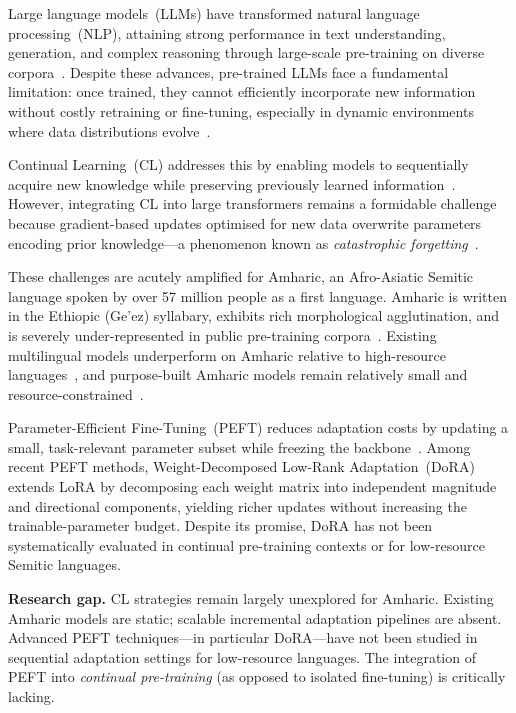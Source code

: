 \documentclass[11pt,a4paper]{article}
\begin{document}
Large language models~(LLMs) have transformed natural language
processing~(NLP), attaining strong performance in text understanding,
generation, and complex reasoning through large-scale pre-training on
diverse corpora~\cite{Vaswani2017,Brown2020,Devlin2019}.  Despite
these advances, pre-trained LLMs face a fundamental limitation: once
trained, they cannot efficiently incorporate new information without
costly retraining or fine-tuning, especially in dynamic environments
where data distributions evolve~\cite{Wang2023survey}.

Continual Learning~(CL) addresses this by enabling models to
sequentially acquire new knowledge while preserving previously learned
information~\cite{Parisi2019,Kirkpatrick2017}.  However, integrating
CL into large transformers remains a formidable challenge because
gradient-based updates optimised for new data overwrite parameters
encoding prior knowledge---a phenomenon known as \emph{catastrophic
forgetting}~\cite{Kirkpatrick2017,McCloskey1989}.

These challenges are acutely amplified for Amharic, an Afro-Asiatic
Semitic language spoken by over 57 million people as a first language.
Amharic is written in the Ethiopic (Ge'ez) syllabary, exhibits rich
morphological agglutination, and is severely under-represented in
public pre-training corpora~\cite{Tonja2024EthioLLM,Alebachew2025}.
Existing multilingual models underperform on Amharic relative to
high-resource languages~\cite{Adelani2023}, and purpose-built Amharic
models remain relatively small and resource-constrained~\cite{Azime2021}.

Parameter-Efficient Fine-Tuning~(PEFT) reduces adaptation costs by
updating a small, task-relevant parameter subset while freezing the
backbone~\cite{Houlsby2019,Hu2022LoRA}.  Among recent PEFT methods,
Weight-Decomposed Low-Rank Adaptation~(DoRA)~\cite{Liu2024DoRA} extends
LoRA by decomposing each weight matrix into independent magnitude and
directional components, yielding richer updates without increasing the
trainable-parameter budget.  Despite its promise, DoRA has not been
systematically evaluated in continual pre-training contexts or for
low-resource Semitic languages.

\textbf{Research gap.}  CL strategies remain largely unexplored for
Amharic.  Existing Amharic models are static; scalable incremental
adaptation pipelines are absent.  Advanced PEFT techniques---in
particular DoRA---have not been studied in sequential adaptation settings
for low-resource languages.  The integration of PEFT into
\emph{continual pre-training} (as opposed to isolated fine-tuning) is
critically lacking.
\end{document}
